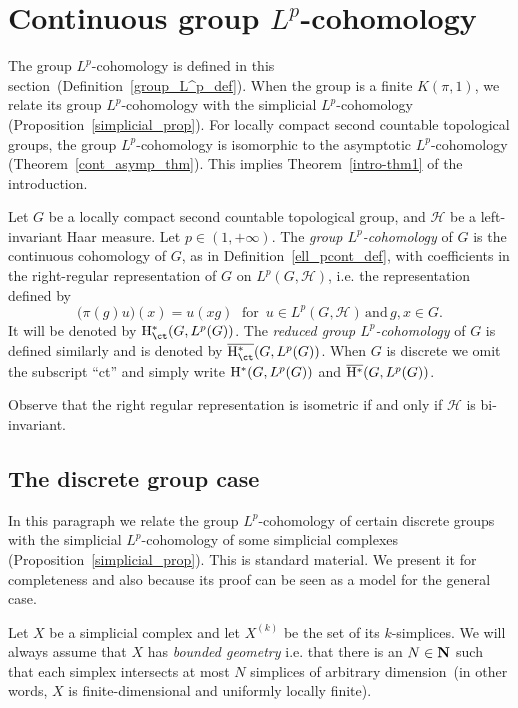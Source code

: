 \section{Continuous group \texorpdfstring{$L^p$}{Lp}-cohomology}\label{3}

The group $L^p$-cohomology is defined in this section~(Definition~\ref{group_L^p_def}). When the group is a finite $K(\pi, 1)$, we relate its group $L^p$-cohomology with the simplicial $L^p$-cohomology (Proposition~\ref{simplicial_prop}). For locally compact second countable topological groups, the group $L^p$-cohomology is isomorphic to the asymptotic $L^p$-cohomology (Theorem~\ref{cont_asymp_thm}). This implies Theorem~\ref{intro-thm1} of the introduction.

\begin{defi}\label{group_L^p_def}
Let $G$ be a locally compact second countable topological group, and $\mathcal H$ be a left-invariant Haar measure. Let $p \in (1, +\infty)$. The \emph{group $L^p$-cohomology} of $G$ is the continuous cohomology of $G$, as in Definition~\ref{ell_pcont_def}, with coefficients in the right-regular representation of $G$ on $L^p (G, \mathcal H)$, i.e. the representation defined by
\[
\bigl(\pi (g) u\bigr)(x) = u(xg)\;\text{ for }\,u \in L^p (G, \mathcal H)\,\text{and}\,g, x \in G.
\]
It will be denoted by ${\rm H}_{\ct}^* (G, L^p (G))$. The \emph{reduced group $L^p$-cohomology} of $G$ is defined similarly and is denoted by $\overline{{\rm H}_{\ct}^*} (G, L^p (G))$. When $G$ is discrete we omit the subscript ``ct'' and simply write ${\rm H}^* (G, L^p (G))$ and $\overline{{\rm H}^*} (G, L^p (G))$.
\end{defi}

Observe that the right regular representation is isometric if and only if $\mathcal H$ is bi-invariant.

\subsection*{The discrete group case}\label{simplicial_subsection}
In this paragraph we relate the group $L^p$-cohomology of certain discrete groups with the simplicial $L^p$-cohomology of some simplicial complexes (Proposition~\ref{simplicial_prop}). This is standard material. We present it for completeness and also because its proof can be seen as a model for the general case.

Let $X$ be a simplicial complex and let $X^{(k)}$ be the set of its $k$-simplices. We will always assume that $X$ has \emph{bounded geometry}
i.e. that there is an $N \in {\bf N}$ such that each simplex intersects at most $N$ simplices of arbitrary dimension~(in other words, $X$ is finite-dimensional and uniformly locally finite).

